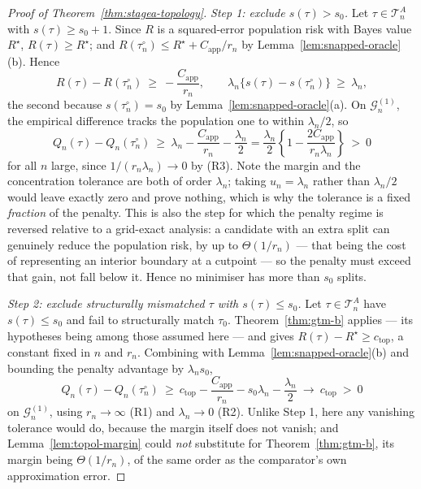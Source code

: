 \documentclass[11pt]{article}
\theoremstyle{plain}
\theoremstyle{definition}
\theoremstyle{remark}
\newcommand{\cT}{\mathcal{T}}
\begin{document}
\begin{proof}[Proof of Theorem~\ref{thm:stagea-topology}]
\emph{Step 1: exclude \(s(\tau)>s_0\).}
Let \(\tau\in\cT^A_n\) with \(s(\tau)\ge s_0+1\). Since \(R\) is a squared-error
population risk with Bayes value \(R^\star\), \(R(\tau)\ge R^\star\); and
\(R(\tau_n^\circ)\le R^\star+C_{\mathrm{app}}/r_n\) by
Lemma~\ref{lem:snapped-oracle}(b). Hence
\[
  R(\tau)-R(\tau_n^\circ)\ \ge\ -\frac{C_{\mathrm{app}}}{r_n},
  \qquad
  \lambda_n\bigl\{s(\tau)-s(\tau_n^\circ)\bigr\}\ \ge\ \lambda_n,
\]
the second because \(s(\tau_n^\circ)=s_0\) by
Lemma~\ref{lem:snapped-oracle}(a). On \(\mathcal{G}_n^{(1)}\), the empirical
difference tracks the population one to within \(\lambda_n/2\), so
\[
  Q_n(\tau)-Q_n(\tau_n^\circ)
  \ \ge\
  \lambda_n-\frac{C_{\mathrm{app}}}{r_n}-\frac{\lambda_n}{2}
  =
  \frac{\lambda_n}{2}
  \left\{1-\frac{2C_{\mathrm{app}}}{r_n\lambda_n}\right\}
  \ >\ 0
\]
for all \(n\) large, since \(1/(r_n\lambda_n)\to0\) by (R3). Note the margin
and the concentration tolerance are both of order \(\lambda_n\); taking
\(u_n=\lambda_n\) rather than \(\lambda_n/2\) would leave exactly zero and
prove nothing, which is why the tolerance is a fixed \emph{fraction} of the
penalty. This is also the step for which the penalty regime is reversed
relative to a grid-exact analysis: a candidate with an extra split can
genuinely reduce the population risk, by up to
\(\Theta(1/r_n)\) --- that being the cost of representing an interior boundary
at a cutpoint --- so the penalty must exceed that gain, not fall below it.
Hence no minimiser has more than \(s_0\) splits.

\emph{Step 2: exclude structurally mismatched \(\tau\) with
\(s(\tau)\le s_0\).}
Let \(\tau\in\cT^A_n\) have \(s(\tau)\le s_0\) and fail to structurally match
\(\tau_0\). Theorem~\ref{thm:gtm-b} applies --- its hypotheses being among
those assumed here --- and gives \(R(\tau)-R^\star\ge c_{\mathrm{top}}\), a
constant fixed in \(n\) and \(r_n\). Combining with
Lemma~\ref{lem:snapped-oracle}(b) and bounding the penalty advantage by
\(\lambda_ns_0\),
\[
  Q_n(\tau)-Q_n(\tau_n^\circ)
  \ \ge\
  c_{\mathrm{top}}-\frac{C_{\mathrm{app}}}{r_n}
  -s_0\lambda_n-\frac{\lambda_n}{2}
  \ \longrightarrow\ c_{\mathrm{top}}\ >\ 0
\]
on \(\mathcal{G}_n^{(1)}\), using \(r_n\to\infty\) (R1) and \(\lambda_n\to0\) (R2).
Unlike Step 1, here any vanishing tolerance would do, because the margin
itself does not vanish; and Lemma~\ref{lem:topol-margin} could \emph{not}
substitute for Theorem~\ref{thm:gtm-b}, its margin being \(\Theta(1/r_n)\),
of the same order as the comparator's own approximation error.


\end{proof}
\end{document}
